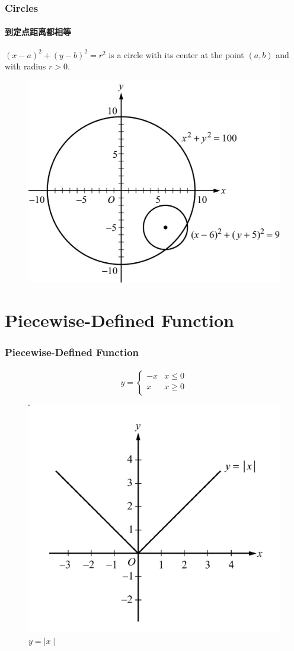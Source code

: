 \documentclass[
	11pt, %
]{beamer}
\begin{document}
\begin{frame}
	\frametitle{Circles}
	\framesubtitle{到定点距离都相等}
	\begin{theorem}[圆]
		$(x - a)^2 + (y - b)^2 = r^2$ is a circle with its center at the point $(a, b)$ and with radius $r >0$.
	\end{theorem}

		\begin{figure}
		\includegraphics[width=0.6\linewidth]{Circles.jpg}
	\end{figure}
\end{frame}



\section{Piecewise-Defined Function}



\begin{frame}
	\frametitle{Piecewise-Defined Function}
	\framesubtitle{}

\[y= \begin{cases} 
      -x & x\leq 0 \\
      x &  x\geq 0 \\
   \end{cases}
\]
	\begin{figure}
		\includegraphics[width=0.5\linewidth]{Piecewise_Defined_Function.png}
		\caption{$y = \mid x \mid$}
	\end{figure}

\end{frame}
\end{document}
